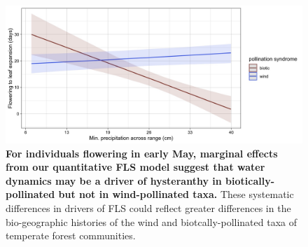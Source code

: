 \documentclass{article}
\begin{document}
 \begin{figure}[h!] 
        \centering
          \includegraphics[width=\textwidth]{..//HarvardForest/apcs.jpeg}
           \caption{\textbf{ For individuals flowering in early May, marginal effects from our quantitative FLS model suggest that water dynamics may be a driver of hysteranthy in biotically-pollinated but not in wind-pollinated taxa.}  These systematic differences in drivers of FLS could reflect greater differences in the bio-geographic histories of the wind and biotcally-pollinated taxa of temperate forest communities.}
        \label{fig:apcs}
    \end{figure}

    
\end{document}
